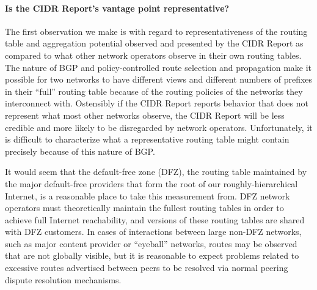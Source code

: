 \paragraph{Is the CIDR Report's vantage point representative?}

The first observation we make is with regard to representativeness of the
routing table and aggregation potential observed and presented by the CIDR
Report as compared to what other network operators observe in their own routing
tables. The nature of BGP and policy-controlled route selection and propagation
make it possible for two networks to have different views and different numbers
of prefixes in their ``full'' routing table because of the routing policies of
the networks they interconnect with. Ostensibly if the CIDR Report reports
behavior that does not represent what most other networks observe, the CIDR
Report will be less credible and more likely to be disregarded by network
operators.  Unfortunately, it is difficult to characterize what a
representative routing table might contain precisely because of this nature of
BGP.

It would seem that the default-free zone (DFZ), the routing table maintained by
the major default-free providers that form the root of our roughly-hierarchical
Internet, is a reasonable place to take this measurement from. DFZ network
operators must theoretically maintain the fullest routing tables in order to
achieve full Internet reachability, and versions of these routing tables are
shared with DFZ customers. In cases of interactions between large
non-DFZ networks, such as major content provider or ``eyeball'' networks,
routes may be observed that are not globally visible, but it is reasonable to
expect problems related to excessive routes advertised between peers to be
resolved via normal peering dispute resolution mechanisms.

